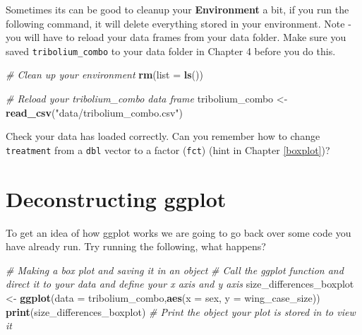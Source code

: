 \documentclass[
]{book}
\newenvironment{Shaded}{\begin{snugshade}}{\end{snugshade}}
\newcommand{\AttributeTok}[1]{\textcolor[rgb]{0.13,0.29,0.53}{#1}}
\newcommand{\CommentTok}[1]{\textcolor[rgb]{0.56,0.35,0.01}{\textit{#1}}}
\newcommand{\FunctionTok}[1]{\textcolor[rgb]{0.13,0.29,0.53}{\textbf{#1}}}
\newcommand{\NormalTok}[1]{#1}
\newcommand{\OtherTok}[1]{\textcolor[rgb]{0.56,0.35,0.01}{#1}}
\newcommand{\StringTok}[1]{\textcolor[rgb]{0.31,0.60,0.02}{#1}}
\begin{document}
Sometimes its can be good to cleanup your \textbf{Environment} a bit, if you run the following command, it will delete everything stored in your environment. Note - you will have to reload your data frames from your data folder. Make sure you saved \texttt{tribolium\_combo} to your data folder in Chapter 4 before you do this.

\begin{Shaded}
\begin{Highlighting}[]
\CommentTok{\# Clean up your environment}
\FunctionTok{rm}\NormalTok{(}\AttributeTok{list =} \FunctionTok{ls}\NormalTok{())}
\end{Highlighting}
\end{Shaded}

\begin{Shaded}
\begin{Highlighting}[]
\CommentTok{\# Reload your tribolium\_combo data frame}
\NormalTok{tribolium\_combo }\OtherTok{\textless{}{-}} \FunctionTok{read\_csv}\NormalTok{(}\StringTok{"data/tribolium\_combo.csv"}\NormalTok{)}
\end{Highlighting}
\end{Shaded}

Check your data has loaded correctly. Can you remember how to change \texttt{treatment} from a \texttt{dbl} vector to a factor (\texttt{fct}) (hint in Chapter \ref{boxplot})?

\hypertarget{deconstructing-ggplot}{%
\section{Deconstructing ggplot}\label{deconstructing-ggplot}}

To get an idea of how ggplot works we are going to go back over some code you have already run. Try running the following, what happens?

\begin{Shaded}
\begin{Highlighting}[]
\CommentTok{\# Making a box plot and saving it in an object}
\CommentTok{\# Call the ggplot function and direct it to your data and define your x axis and y axis}
\NormalTok{size\_differences\_boxplot }\OtherTok{\textless{}{-}} \FunctionTok{ggplot}\NormalTok{(}\AttributeTok{data =}\NormalTok{ tribolium\_combo,}\FunctionTok{aes}\NormalTok{(}\AttributeTok{x =}\NormalTok{ sex, }\AttributeTok{y =}\NormalTok{ wing\_case\_size)) }
\FunctionTok{print}\NormalTok{(size\_differences\_boxplot) }\CommentTok{\# Print the object your plot is stored in to view it}
\end{Highlighting}
\end{Shaded}
\end{document}
